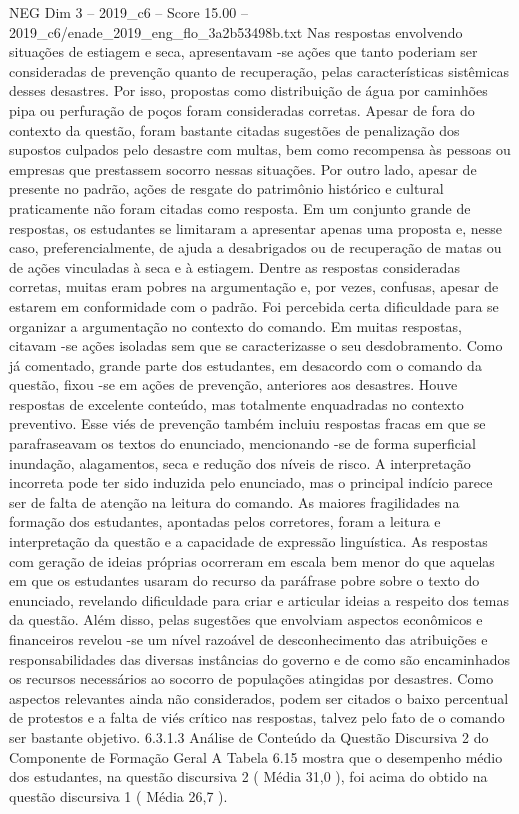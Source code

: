 \begin{textsample}{NEG Dim 3 – 2019\_c6 – Score 15.00 – 2019\_c6/enade\_2019\_eng\_flo\_3a2b53498b.txt}
Nas respostas envolvendo situações de estiagem e seca, apresentavam -se ações que tanto poderiam ser consideradas de prevenção quanto de recuperação, pelas características sistêmicas desses desastres.
Por isso, propostas como distribuição de água por caminhões pipa ou perfuração de poços foram consideradas corretas.
Apesar de fora do contexto da questão, foram bastante citadas sugestões de penalização dos supostos culpados pelo desastre com multas, bem como recompensa às pessoas ou empresas que prestassem socorro nessas situações.
Por outro lado, apesar de presente no padrão, ações de resgate do patrimônio histórico e cultural praticamente não foram citadas como resposta.
Em um conjunto grande de respostas, os estudantes se limitaram a apresentar apenas uma proposta e, nesse caso, preferencialmente, de ajuda a desabrigados ou de recuperação de matas ou de ações vinculadas à seca e à estiagem.
Dentre as respostas consideradas corretas, muitas eram pobres na argumentação e, por vezes, confusas, apesar de estarem em conformidade com o padrão.
Foi percebida certa dificuldade para se organizar a argumentação no contexto do comando.
Em muitas respostas, citavam -se ações isoladas sem que se caracterizasse o seu desdobramento.
Como já comentado, grande parte dos estudantes, em desacordo com o comando da questão, fixou -se em ações de prevenção, anteriores aos desastres.
Houve respostas de excelente conteúdo, mas totalmente enquadradas no contexto preventivo.
Esse viés de prevenção também incluiu respostas fracas em que se parafraseavam os textos do enunciado, mencionando -se de forma superficial inundação, alagamentos, seca e redução dos níveis de risco.
A interpretação incorreta pode ter sido induzida pelo enunciado, mas o principal indício parece ser de falta de atenção na leitura do comando.
As maiores fragilidades na formação dos estudantes, apontadas pelos corretores, foram a leitura e interpretação da questão e a capacidade de expressão linguística.
As respostas com geração de ideias próprias ocorreram em escala bem menor do que aquelas em que os estudantes usaram do recurso da paráfrase pobre sobre o texto do enunciado, revelando dificuldade para criar e articular ideias a respeito dos temas da questão.
Além disso, pelas sugestões que envolviam aspectos econômicos e financeiros revelou -se um nível razoável de desconhecimento das atribuições e responsabilidades das diversas instâncias do governo e de como são encaminhados os recursos necessários ao socorro de populações atingidas por desastres.
Como aspectos relevantes ainda não considerados, podem ser citados o baixo percentual de protestos e a falta de viés crítico nas respostas, talvez pelo fato de o comando ser bastante objetivo. 6.3.1.3 Análise de Conteúdo da Questão Discursiva 2 do Componente de Formação Geral A Tabela 6.15 mostra que o desempenho médio dos estudantes, na questão discursiva 2 ( Média 31,0 ), foi acima do obtido na questão discursiva 1 ( Média 26,7 ).

\end{textsample}
